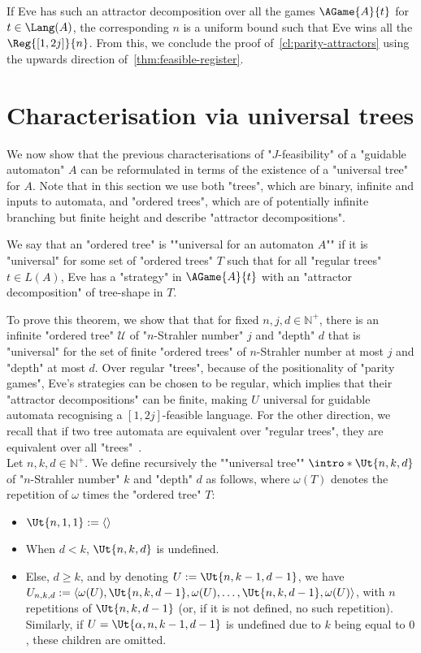\documentclass[a4paper,UKenglish,cleveref, autoref, thm-restate]{lipics-v2021}
\newcommand{\NN}{\mathbb{N}}
\newcommand{\A}{{A}}
\newcommand{\U}{\mathcal{U}}
\renewcommand{\geq}{\geqslant}
\begin{document}
If  Eve has such an attractor decomposition over all the games $\AGame{A}{t}$ for $t\in \Lang(A)$, the corresponding $n$ is a uniform bound such that Eve wins all the $\Reg{[1,2j]}{n}$. From this, we conclude the proof of~\cref{cl:parity-attractors} using the upwards direction of~\cref{thm:feasible-register}.


\section{Characterisation via universal trees}\label{sec:universal}

We now show that the previous characterisations of "$J$-feasibility" of a "guidable automaton" $\A$ can be reformulated in terms of the existence of a "universal tree" for $\A$. Note that in this section we use both "trees", which are binary, infinite and inputs to automata, and "ordered trees", which are of potentially infinite branching but finite height and describe "attractor decompositions".

\AP We say that an "ordered tree" is ""universal for an automaton $\A$"" if it is "universal" for some set of "ordered trees" $T$ such that for all "regular trees" $t\in L(\A)$, Eve has a "strategy" in $\AGame{\A}{t}$ with an "attractor decomposition" of tree-shape in $T$.


\thmuniversaltrees*

To prove this theorem, we show that that for fixed $n,j,d\in \NN^+$, there is an infinite "ordered tree" $\U$ of "$n$-Strahler number" $j$ and "depth" $d$ that is "universal" for the set of finite "ordered trees" of $n$-Strahler number at most $j$ and "depth" at most $d$. Over regular "trees", because of the positionality of "parity games", Eve's strategies can be chosen to be regular, which implies that their "attractor decompositions" can be finite, making $U$ universal for guidable automata recognising a $[1,2j]$-feasible language. For the other direction, we recall that if two tree automata are equivalent over "regular trees", they are equivalent over all "trees"~\cite{RabinRegular}.\\


\AP Let $n,k,d\in \NN^+$. We define recursively the ""universal tree"" $\intro*\Ut{n,k,d}$
of "$n$-Strahler number" $k$ and "depth" $d$ as follows, where $\omega(T)$ denotes the repetition of $\omega$ times the "ordered tree" $T$:

\begin{itemize}
	\item $\Ut{n,1,1} := \langle \rangle$
	\item When $d<k$, $\Ut{n,k,d}$ is undefined.
	\item Else, $d\geq k$, and by denoting $U := \Ut{n,k-1,d-1}$, we have \\$U_{n,k,d} := \langle \omega(U), \Ut{n,k,d-1}, \omega(U), \dots, \Ut{n,k,d-1}, \omega(U)\rangle$, with $n$ repetitions of $\Ut{n,k,d-1}$ (or, if it is not defined, no such repetition). Similarly, if $U = \Ut{\alpha,n,k-1,d-1}$ is undefined due to $k$ being equal to $0$, these children are omitted.
\end{itemize}
\end{document}
